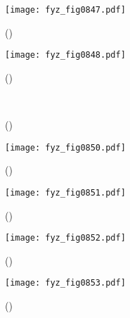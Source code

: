     \begin{figure}[ht!] %
      \centering
      \texttt{[image: fyz\_fig0847.pdf]}
      \caption{
               (\cite[s.~707]{Feynman02})}
      \label{fyz:fig0847}
    \end{figure}

    \begin{figure}[ht!] %
      \centering
      \texttt{[image: fyz\_fig0848.pdf]}
      \caption{
               (\cite[s.~707]{Feynman02})}
      \label{fyz:fig0848}
    \end{figure}

    \begin{figure}[ht!] %
      \centering
                     \\
      \caption{
               (\cite[s.~748]{Feynman02})}
      \label{fyz:fig0849}
    \end{figure}

    \begin{figure}[ht!] %
      \centering
      \texttt{[image: fyz\_fig0850.pdf]}
      \caption{
               (\cite[s.~707]{Feynman02})}
      \label{fyz:fig0850}
    \end{figure}

    \begin{figure}[ht!] %
      \centering
      \texttt{[image: fyz\_fig0851.pdf]}
      \caption{
               (\cite[s.~707]{Feynman02})}
      \label{fyz:fig0851}
    \end{figure}

    \begin{figure}[ht!] %
      \centering
      \texttt{[image: fyz\_fig0852.pdf]}
      \caption{
               (\cite[s.~707]{Feynman02})}
      \label{fyz:fig0852}
    \end{figure}

    \begin{figure}[ht!] %
      \centering
      \texttt{[image: fyz\_fig0853.pdf]}
      \caption{
               (\cite[s.~707]{Feynman02})}
      \label{fyz:fig0853}
    \end{figure}

    

